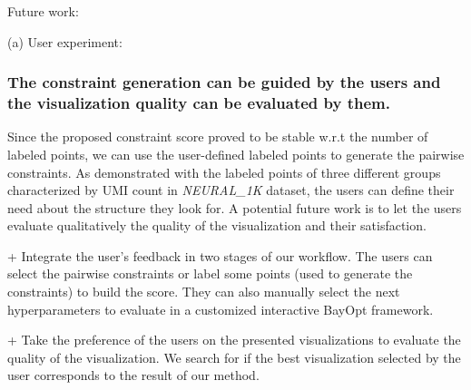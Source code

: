 Future work:

(a) User experiment:
\subsubsection*{The constraint generation can be guided by the users and the visualization quality can be evaluated by them.}
Since the proposed constraint score proved to be stable w.r.t the number of labeled points,
we can use the user-defined labeled points to generate the pairwise constraints.
As demonstrated with the labeled points of three different groups characterized by UMI count in \emph{NEURAL\_1K} dataset, the users can define their need about the structure they look for.
A potential future work is to let the users evaluate qualitatively the quality of the visualization and their satisfaction.

+ Integrate the user's feedback in two stages of our workflow.
The users can select the pairwise constraints or label some points (used to generate the constraints) to build the score.
They can also manually select the next hyperparameters to evaluate in a customized interactive BayOpt framework.

+ Take the preference of the users on the presented visualizations to evaluate the quality of the visualization. We search for if the best visualization selected by the user corresponds to the result of our method.